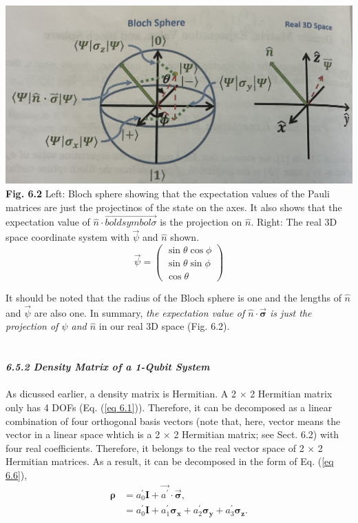 \documentclass{article}
\newcommand{\bfit}[1]{\textit{\textbf{#1}}}
\begin{document}
\includegraphics[scale=0.4]{Fig. 6.2.jpeg}\\
\textbf{Fig. 6.2} Left: Bloch sphere showing that the expectation values of the Pauli matrices are just the
projectinos of the state on the axes. It also shows that the expectation value of $\hat{n}\cdot\vec{boldsymbol{\sigma}}$ is the
projection on $\hat{n}$. Right: The real 3D space coordinate system with $\vec{\psi}$ and $\hat{n}$ shown.
\begin{equation}\label{eq 6.43}
    \vec{\psi}=\begin{pmatrix}
        \sin{\theta}\cos{\phi}\\
        \sin{\theta}\sin{\phi}\\
        \cos{\theta}
    \end{pmatrix}\tag{6.43}
\end{equation}

It should be noted that the radius of the Bloch sphere is one and the lengths
of $\hat{n}$ and $\vec{\psi}$ are also one. In summary, \textit{the expectation value of 
$\hat{n}\cdot\vec{\boldsymbol{\sigma}}$ is just the projection of $\psi$ and $\hat{n}$}
in our real 3D space (Fig. 6.2).\\\\\\
\bfit{\large 6.5.2 Density Matrix of a 1-Qubit System}\\\\
As dicussed earlier, a density matrix is Hermitian. A 2 $\times$ 2 Hermitian
matrix only has 4 DOFs (Eq. (\ref{eq 6.1})). Therefore, it can be decomposed as a linear
combination of four orthogonal basis vectors (note that, here, vector means the vector in a
linear space whtich is a 2 $\times$ 2 Hermitian matrix; see Sect. 6.2) with
four real coefficients. Therefore, it belongs to the real vector space of 2 $\times$ 2
Hermitian matrices. As a result, it can be decomposed in the form of Eq. (\ref{eq 6.6}),
\begin{align*}\label{eq 6.44}
    \boldsymbol{\rho}&=a_0^\prime\boldsymbol{I}+\vec{a^\prime}\cdot\vec{\boldsymbol{\sigma}},\\
    &=a_0^\prime\boldsymbol{I}+a_1^\prime\boldsymbol{\sigma_x}+
    a_2^\prime\boldsymbol{\sigma_y}+a_3^\prime\boldsymbol{\sigma_z}.\tag{6.44}
\end{align*}
\end{document}
